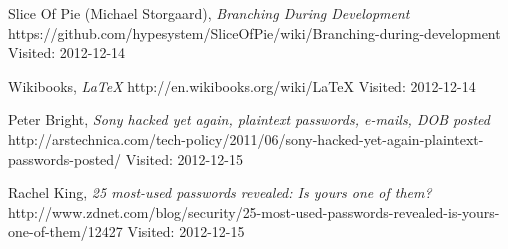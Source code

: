 \begin{thebibliography}{99}
        Slice Of Pie (Michael Storgaard),
        \emph{Branching During Development}\newline
        https://github.com/hypesystem/SliceOfPie/wiki/Branching-during-development\newline
        Visited: 2012-12-14
        
        Wikibooks,
        \emph{\LaTeX}\newline
        http://en.wikibooks.org/wiki/LaTeX\newline
        Visited: 2012-12-14
        
        Peter Bright,
        \emph{Sony hacked yet again, plaintext passwords, e-mails, DOB posted}\newline
        http://arstechnica.com/tech-policy/2011/06/sony-hacked-yet-again-plaintext-passwords-posted/\newline
        Visited: 2012-12-15
    
        Rachel King,
        \emph{25 most-used passwords revealed: Is yours one of them?}\newline
        http://www.zdnet.com/blog/security/25-most-used-passwords-revealed-is-yours-one-of-them/12427\newline
        Visited: 2012-12-15
\end{thebibliography}